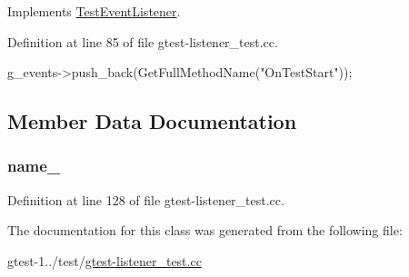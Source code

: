 \-Implements \hyperlink{classtesting_1_1TestEventListener_a02f601dff022b7d252f54f559acaf3f7}{\-Test\-Event\-Listener}.



\-Definition at line 85 of file gtest-\/listener\-\_\-test.\-cc.


\begin{DoxyCode}
                                              {
    g_events->push_back(GetFullMethodName("OnTestStart"));
  }
\end{DoxyCode}


\subsection{\-Member \-Data \-Documentation}
\hypertarget{classtesting_1_1internal_1_1EventRecordingListener_a46d25a1d56b8ab56e84b8bd0c7581e8f}{
\subsubsection[{name\-\_\-}]{ {\bf name\-\_\-}}}\label{d1/dde/classtesting_1_1internal_1_1EventRecordingListener_a46d25a1d56b8ab56e84b8bd0c7581e8f}


\-Definition at line 128 of file gtest-\/listener\-\_\-test.\-cc.



\-The documentation for this class was generated from the following file\-:\begin{DoxyCompactItemize}
\item 
gtest-\/1../test/\hyperlink{gtest-listener__test_8cc}{gtest-\/listener\-\_\-test.\-cc}\end{DoxyCompactItemize}

